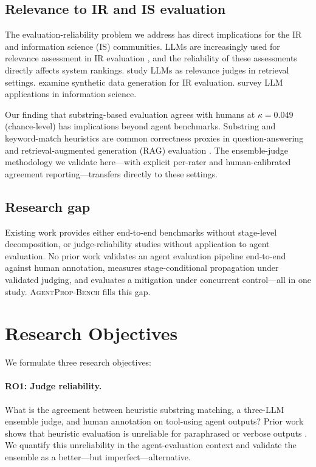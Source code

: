 \documentclass{ieeeaccess}
\newcommand{\bench}{\textsc{AgentProp-Bench}\xspace}
\begin{document}
\subsection{Relevance to IR and IS evaluation}

The evaluation-reliability problem we address has direct implications
for the IR and information science (IS) communities.
LLMs are increasingly used for relevance assessment in IR evaluation
\cite{balog2025rankers}, and the reliability of these
assessments directly affects system rankings.
\cite{salemi2024retrieval} study LLMs as relevance judges in retrieval
settings.
\cite{rahmani2024synthetic} examine synthetic data generation for IR
evaluation.
\cite{zhu2024llmir} survey LLM applications in information science.

Our finding that substring-based evaluation agrees with humans at
$\kappa{=}0.049$ (chance-level) has implications beyond agent
benchmarks.
Substring and keyword-match heuristics are common correctness proxies in
question-answering and retrieval-augmented generation (RAG) evaluation
\cite{es2024ragas,niu2024ragtruth}.
The ensemble-judge methodology we validate here---with explicit
per-rater and human-calibrated agreement reporting---transfers directly
to these settings.

\subsection{Research gap}

Existing work provides either end-to-end benchmarks without stage-level
decomposition, or judge-reliability studies without application to agent
evaluation.
No prior work validates an agent evaluation pipeline end-to-end against
human annotation, measures stage-conditional propagation under validated
judging, and evaluates a mitigation under concurrent control---all in
one study.
\bench{} fills this gap.


\section{Research Objectives}
\label{sec:ro}

We formulate three research objectives:

\paragraph{RO1: Judge reliability.}
What is the agreement between heuristic substring matching, a
three-LLM ensemble judge, and human annotation on tool-using agent
outputs?
Prior work shows that heuristic evaluation is unreliable for
paraphrased or verbose outputs \cite{soboroff2024dont}.
We quantify this unreliability in the agent-evaluation context and
validate the ensemble as a better---but imperfect---alternative.
\end{document}
